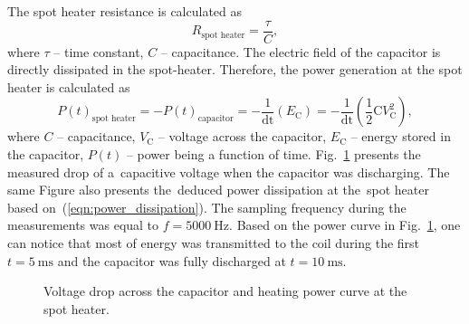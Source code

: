 The spot heater resistance is calculated as
\begin{equation}
    R_\text{spot heater} = \frac{\tau}{C},
\end{equation}
where $\tau$ -- time constant, $C$ -- capacitance. The electric field of the capacitor is directly dissipated in the spot-heater. Therefore, the power generation at the spot heater is calculated as
\begin{equation}
    P(t)_\text{spot heater} = -P(t)_\text{capacitor} = -\frac{1}{\text{dt}} (E_\text{C}) = -\frac{1}{\text{dt}} (\frac{1}{2} \text{C}V_\text{C}^2),
    \label{eqn:power_dissipation}
\end{equation}
where $C$ -- capacitance, $V_\text{C}$ -- voltage across the capacitor, $E_\text{C}$ -- energy stored in the capacitor, $P(t)$ -- power being a function of time. Fig.~\ref{fig:capacitor_discharge} presents the measured drop of a~capacitive voltage when the capacitor was discharging. The same Figure also presents the~deduced power dissipation at the~spot heater based on~(\ref{eqn:power_dissipation}). The sampling frequency during the measurements was equal to $f=5000~\text{Hz}$. Based on the power curve in Fig.~\ref{fig:capacitor_discharge}, one can notice that most of energy was transmitted to the coil during the first $t=5~\text{ms}$ and the capacitor was fully discharged at $t=10~\text{ms}$.

\begin{figure}[H]
\centering
{}
\caption{Voltage drop across the capacitor and heating power curve at the spot heater.}
\label{fig:capacitor_discharge}
\end{figure}

